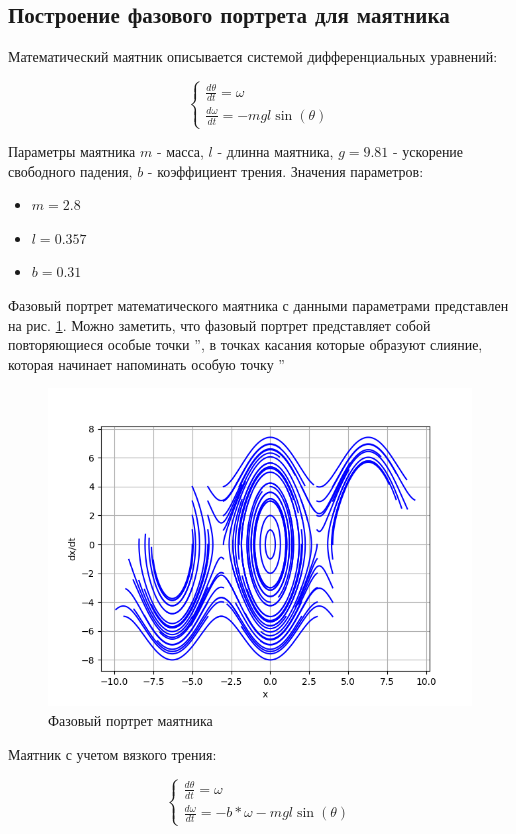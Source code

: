 \subsection{Построение фазового портрета для маятника}

Математический маятник описывается системой дифференциальных уравнений:

$$
\begin{cases}
{\frac{d \theta}{dt}} = \omega \\ 
{\frac{d \omega}{dt}} = - m g l \sin(\theta)
\end{cases}
$$

Параметры маятника $m$ - масса, $l$ - длинна маятника, $g = 9.81$ - ускорение свободного падения, $b$ - коэффициент трения.
Значения параметров:

\begin{itemize}
	\item $m = 2.8$
	\item $l = 0.357$
	\item $b = 0.31$
\end{itemize}

Фазовый портрет математического маятника с данными параметрами представлен на рис. \ref{fig:15}.
Можно заметить, что фазовый портрет представляет собой повторяющиеся особые точки \textquotedblright,
в точках касания которые образуют слияние, которая начинает напоминать особую точку \textquotedblright

\begin{figure}[H]
	\centering
	\includegraphics[width=0.7\linewidth]{body/images/Pendulum-system.png}
	\caption{Фазовый портрет маятника}
	\label{fig:15}
\end{figure}

Маятник с учетом вязкого трения:

$$
\begin{cases}
{\frac{d \theta}{dt}} = \omega \\ 
{\frac{d \omega}{dt}} = -b * \omega - m g l \sin(\theta)
\end{cases}
$$

